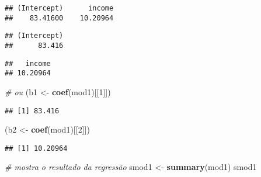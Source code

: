 \documentclass[
]{book}
\newenvironment{Shaded}{\begin{snugshade}}{\end{snugshade}}
\newcommand{\CommentTok}[1]{\textcolor[rgb]{0.56,0.35,0.01}{\textit{#1}}}
\newcommand{\DecValTok}[1]{\textcolor[rgb]{0.00,0.00,0.81}{#1}}
\newcommand{\FunctionTok}[1]{\textcolor[rgb]{0.13,0.29,0.53}{\textbf{#1}}}
\newcommand{\NormalTok}[1]{#1}
\newcommand{\OtherTok}[1]{\textcolor[rgb]{0.56,0.35,0.01}{#1}}
\newcommand{\SpecialCharTok}[1]{\textcolor[rgb]{0.81,0.36,0.00}{\textbf{#1}}}
\begin{document}
\begin{verbatim}
## (Intercept)      income 
##    83.41600    10.20964
\end{verbatim}

\begin{Shaded}
\end{Shaded}

\begin{verbatim}
## (Intercept) 
##      83.416
\end{verbatim}

\begin{Shaded}
\end{Shaded}

\begin{verbatim}
##   income 
## 10.20964
\end{verbatim}

\begin{Shaded}
\begin{Highlighting}[]
\CommentTok{\# ou}
\NormalTok{(b1 }\OtherTok{\textless{}{-}} \FunctionTok{coef}\NormalTok{(mod1)[[}\DecValTok{1}\NormalTok{]])}
\end{Highlighting}
\end{Shaded}

\begin{verbatim}
## [1] 83.416
\end{verbatim}

\begin{Shaded}
\begin{Highlighting}[]
\NormalTok{(b2 }\OtherTok{\textless{}{-}} \FunctionTok{coef}\NormalTok{(mod1)[[}\DecValTok{2}\NormalTok{]])}
\end{Highlighting}
\end{Shaded}

\begin{verbatim}
## [1] 10.20964
\end{verbatim}

\begin{Shaded}
\begin{Highlighting}[]
\CommentTok{\# mostra o resultado da regressão}
\NormalTok{smod1 }\OtherTok{\textless{}{-}} \FunctionTok{summary}\NormalTok{(mod1)}
\NormalTok{smod1}
\end{Highlighting}
\end{Shaded}
\end{document}
